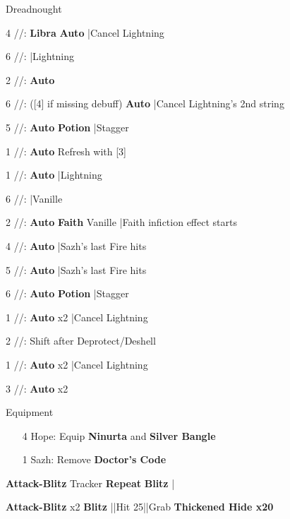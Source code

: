 \begin{fight}{Dreadnought}
	\item [4] \rav/\rav/\sab: \textbf{Libra} \to \textbf{Auto} |Cancel Lightning
	\item [6] \rav/\rav/\rav: |Lightning
	\item [2] \syn/\com/\sab: \textbf{Auto}
	\item [6] \rav/\rav/\rav: ([4] if missing debuff) \textbf{Auto}
		|Cancel Lightning's 2nd string
	\item [5] \rav/\rav/\rav: \textbf{Auto} \to \textbf{\textbf{Potion}}
		|Stagger
	\item [1] \rav/\com/\rav: \textbf{Auto} \to Refresh with [3]
	\item \skip
	\item [1] \rav/\com/\rav: \textbf{Auto} |Lightning
	\item [6] \rav/\rav/\rav: |Vanille
	\item [2] \syn/\com/\sab: \textbf{Auto} \to \textbf{Faith} Vanille |Faith infiction effect starts
	\item [4] \rav/\rav/\sab: \textbf{Auto} |Sazh's last Fire hits
	\item [5] \rav/\rav/\rav: \textbf{Auto} |Sazh's last Fire hits
	\item [6] \rav/\rav/\rav: \textbf{Auto} \to \textbf{\textbf{Potion}} |Stagger
	\item [1] \rav/\com/\rav: \textbf{Auto} x2 |Cancel Lightning
	\item [2] \syn/\com/\sab: Shift after Deprotect/Deshell
	\item [1] \rav/\com/\rav: \textbf{Auto} x2 |Cancel Lightning
	\item [3] \rav/\com/\rav: \textbf{Auto} x2
	\item \skip
\end{fight}
\begin{menu}
	\item Equipment
	\begin{itemize}
		\item [4] Hope: Equip \textbf{Ninurta} and \textbf{Silver Bangle}
		\item [1] Sazh: Remove \textbf{Doctor's Code}
	\end{itemize}
\end{menu}
\begin{mainlist}
	\item {}
	\item {}\textbf{Attack-Blitz} Tracker \to
		[2] \textbf{Repeat} \to \textbf{Blitz} |
	\item \skip
	\item {} \textbf{Attack-Blitz} x2 \to
		\textbf{Blitz} |\skip|Hit 25|\skip|Grab \textbf{Thickened Hide x20}
\end{mainlist}
